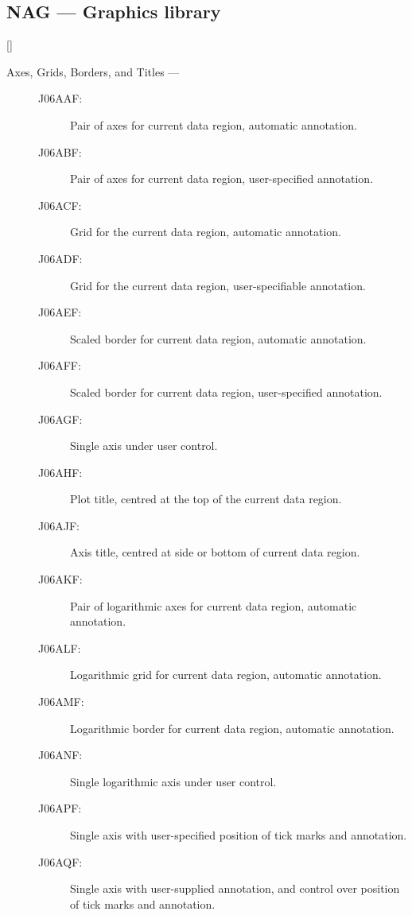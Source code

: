 \newpage

\subsection{NAG --- Graphics library}

\vspace{-9mm}

\hfill []

\vspace{2mm}

\begin{description}

\item [Axes, Grids, Borders, and Titles ---]

\begin{description}
\item [J06AAF:]  Pair of axes for current data region, automatic annotation.
\item [J06ABF:]  Pair of axes for current data region, user-specified annotation.
\item [J06ACF:]  Grid for the current data region, automatic annotation.
\item [J06ADF:]  Grid for the current data region, user-specifiable annotation.
\item [J06AEF:]  Scaled border for current data region, automatic annotation.
\item [J06AFF:]  Scaled border for current data region, user-specified annotation.
\item [J06AGF:]  Single axis under user control.
\item [J06AHF:]  Plot title, centred at the top of the current data region.
\item [J06AJF:]  Axis title, centred at side or bottom of current data region.
\item [J06AKF:]  Pair of logarithmic axes for current data region, automatic annotation.
\item [J06ALF:]  Logarithmic grid for current data region, automatic annotation.
\item [J06AMF:]  Logarithmic border for current data region, automatic annotation.
\item [J06ANF:]  Single logarithmic axis under user control.
\item [J06APF:]  Single axis with user-specified position of tick marks and annotation.
\item [J06AQF:]  Single axis with user-supplied annotation, and control over position of tick marks and annotation.
\end{description}


\end{description}
